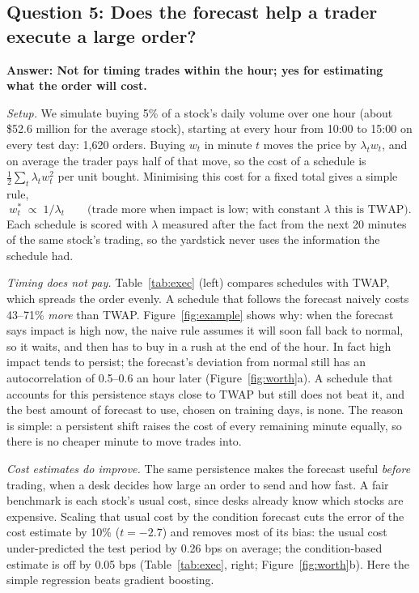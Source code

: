 \documentclass[10pt,letterpaper]{article}
\newcommand{\answer}[1]{\textbf{\color{ink}Answer: #1}}
\begin{document}
\subsection{Question 5: Does the forecast help a trader execute a large order?}
\answer{Not for timing trades within the hour; yes for estimating what the order will cost.}

\textit{Setup.} We simulate buying 5\% of a stock's daily volume over one hour (about \$52.6 million for the average stock), starting at every hour from 10:00 to 15:00 on every test day: 1,620 orders. Buying $w_t$ in minute $t$ moves the price by $\lambda_t w_t$, and on average the trader pays half of that move, so the cost of a schedule is $\tfrac12\sum_t \lambda_t w_t^2$ per unit bought. Minimising this cost for a fixed total gives a simple rule,
\begin{equation}
w_t^* \;\propto\; 1/\lambda_t \qquad \text{(trade more when impact is low; with constant } \lambda \text{ this is TWAP)}.
\end{equation}
Each schedule is scored with $\lambda$ measured after the fact from the next 20 minutes of the same stock's trading, so the yardstick never uses the information the schedule had.

\textit{Timing does not pay.} Table~\ref{tab:exec} (left) compares schedules with TWAP, which spreads the order evenly. A schedule that follows the forecast naively costs 43--71\% \emph{more} than TWAP. Figure~\ref{fig:example} shows why: when the forecast says impact is high now, the naive rule assumes it will soon fall back to normal, so it waits, and then has to buy in a rush at the end of the hour. In fact high impact tends to persist; the forecast's deviation from normal still has an autocorrelation of 0.5--0.6 an hour later (Figure~\ref{fig:worth}a). A schedule that accounts for this persistence stays close to TWAP but still does not beat it, and the best amount of forecast to use, chosen on training days, is none. The reason is simple: a persistent shift raises the cost of every remaining minute equally, so there is no cheaper minute to move trades into.

\textit{Cost estimates do improve.} The same persistence makes the forecast useful \emph{before} trading, when a desk decides how large an order to send and how fast. A fair benchmark is each stock's usual cost, since desks already know which stocks are expensive. Scaling that usual cost by the condition forecast cuts the error of the cost estimate by 10\% ($t = -2.7$) and removes most of its bias: the usual cost under-predicted the test period by 0.26 bps on average; the condition-based estimate is off by 0.05 bps (Table~\ref{tab:exec}, right; Figure~\ref{fig:worth}b). Here the simple regression beats gradient boosting.
\end{document}
